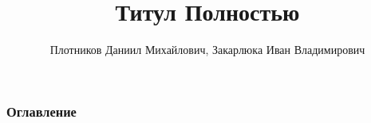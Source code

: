 \documentclass[
	11pt
	   t,
	aspectratio=169
]{beamer}
\title[Титул кратко]{Титул Полностью}
\author[Плотников Д.М., Закарлюка И.В. ]{Плотников Даниил Михайлович, Закарлюка Иван Владимирович}
\institute[СПбГУ]{Санкт-Петербургский Государственный Университет}
\date[Год]{}
\begin{document}
\begin{frame}
	\titlepage
\end{frame}

\begin{frame}
	\frametitle{Оглавление}
	\tableofcontents 
\end{frame}



\end{document}
